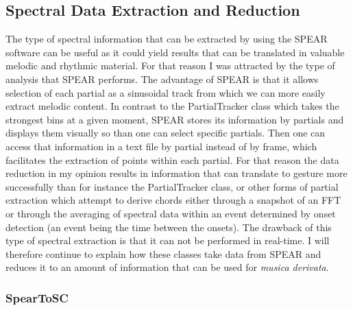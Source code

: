 \subsection{Spectral Data Extraction and Reduction}

The type of spectral information that can be extracted by using the SPEAR software can be useful as it could yield results that can be translated in valuable melodic and rhythmic material. For that reason I was attracted by the type of analysis that SPEAR performs. The advantage of SPEAR is that it allows selection of each partial as a sinusoidal track from which we can more easily extract melodic content. In contrast to the PartialTracker class which takes the strongest bins at a given moment, SPEAR stores its information by partials and displays them visually so than one can select specific partials. Then one can access that information in a text file by partial instead of by frame, which facilitates the extraction of points within each partial. For that reason the data reduction in my opinion results in information that can translate to gesture more successfully than for instance the PartialTracker class, or other forms of partial extraction which attempt to derive chords either through a snapshot of an FFT or through the averaging of spectral data within an event determined by onset detection (an event being the time between the onsets). The drawback of this type of spectral extraction is that it can not be performed in real-time. I will therefore continue to explain how these classes take data from SPEAR and reduces it to an amount of information that can be used for \emph{musica derivata}.

\subsubsection{SpearToSC}
\hypertarget{spearsc}{}

